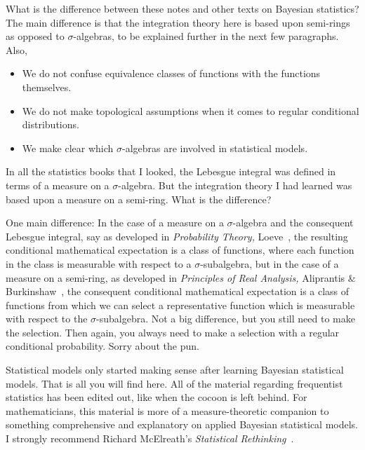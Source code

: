 \documentclass[
twoside=true,
paper=letter,
fontsize=9pt,
pagesize=auto,
leqno,
openany,
headsepline,
overfullrule,
]{scrbook}
\theoremstyle{plain}
\theoremstyle{plain}
\theoremstyle{definition}
\theoremstyle{bfnoteitalic}
\theoremstyle{bfnoteroman}
\newcommand{\textsigma}{\hbox{\large{$\sigma$}}\kern-1pt}
\begin{document}
What is the difference between these notes and other texts on Bayesian statistics?
The main difference is that the integration theory here is based upon semi-rings as opposed to \textsigma\hyp{}algebras, to be explained further in the next few paragraphs.
Also,
\begin{itemize}
\item
We do not confuse equivalence classes of functions with the functions themselves.
\item
We do not make topological assumptions when it comes to regular conditional distributions.
\item
We make clear which \textsigma\hyp{}algebras are involved in statistical models.
\end{itemize}


In all  the statistics books that I looked, the Lebesgue integral was defined in terms of a measure on a  \textsigma\hyp{}algebra.
But the integration theory I had learned was based upon a measure on a  semi-ring.
What is the difference?

One main difference: In the case of a measure on a  \textsigma\hyp{}algebra and the consequent Lebesgue integral, say as developed in \textsl{Probability Theory,} Loeve~\cite{pt_loeve_1960}, the resulting conditional mathematical expectation is a class of functions, where each function in the class is measurable with respect to a
\textsigma\hyp{}subalgebra, but in the case of a measure on a semi-ring, as developed in
\textsl{Principles of Real Analysis,} Aliprantis \& Burkinshaw~\cite{pora_aliprantis_1990}, the consequent conditional mathematical expectation is a class of functions from which we can select a representative function which is measurable with respect to the  \textsigma\hyp{}subalgebra.  Not a big difference, but you still need to make the selection. Then again, you always need to make a selection with a regular conditional probability. Sorry about the pun.





Statistical models only started making sense after learning Bayesian statistical models.  That is all you will find here. All of the material regarding frequentist statistics has been edited out, like when the cocoon is left behind.
For mathematicians, this material is more of a measure-theoretic companion to something  comprehensive and explanatory on applied Bayesian statistical models.  I strongly recommend Richard McElreath's \textsl{Statistical Rethinking}~\cite{sr_mcelreath_2020}.
\end{document}
